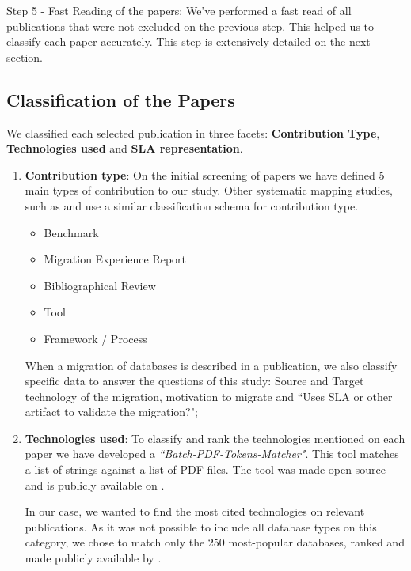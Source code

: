 \documentclass[a4paper]{IEEEtran}
\begin{document}
Step 5 - Fast Reading of the papers: We've performed a fast read of all publications that were not excluded on the previous step. This helped us to classify each paper accurately. This step is extensively detailed on the next section. 


\subsection{Classification of the Papers}

We classified each selected publication in three facets: \textbf{Contribution Type}, \textbf{Technologies used} and \textbf{SLA representation}. 


\begin{enumerate}
    \item \textbf{Contribution type}: On the initial screening of papers we have defined 5 main types of contribution to our study. Other systematic mapping studies, such as \cite{6405289} and \cite{Ameller201542} use a similar classification schema for contribution type.
    \begin{itemize}
      \item Benchmark
      \item Migration Experience Report
      \item Bibliographical Review
      \item Tool
      \item Framework / Process
    \end{itemize}

    When a migration of databases is described in a publication, we also classify specific data to answer the questions of this study:  Source and Target technology of the migration, motivation to migrate and ``Uses SLA or other artifact to validate the migration?"; 

    \item \textbf{Technologies used}: To classify and rank the technologies mentioned on each paper we have developed a \textit{``Batch-PDF-Tokens-Matcher"}. This tool matches a list of strings against a list of PDF files. The tool was made open-source and is publicly available on \cite{pythonBatchPDFTokenMatcher}.

    In our case, we wanted to find the most cited technologies on relevant publications. As it was not possible to include all database types on this category, we chose to match only the 250 most-popular databases, ranked and made publicly available by \cite{dbranking}.


\end{enumerate}
\end{document}
